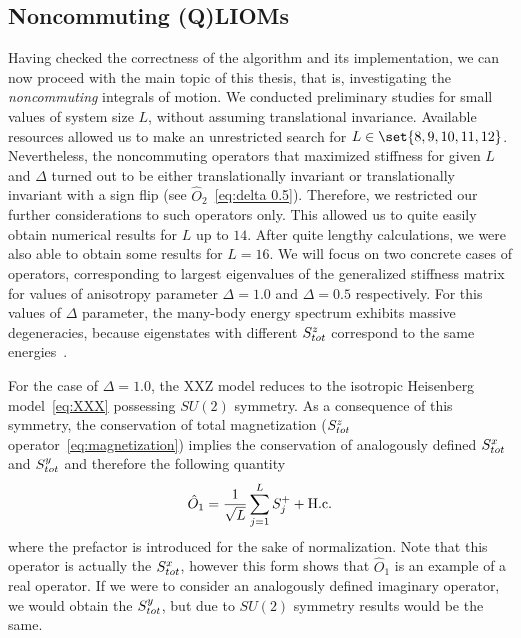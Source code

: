 \subsection{Noncommuting (Q)LIOMs\label{subsec:noncomm qlioms}}
Having checked the correctness of the algorithm and its implementation, we can now proceed with the
main topic of this thesis, that is, investigating the \textit{noncommuting} integrals of motion. 
We conducted preliminary studies for small values of system size \(L\), without assuming
translational invariance. Available resources allowed us to make an unrestricted search for
 \(L \in \set{8,9,10,11,12}\). Nevertheless, the noncommuting operators that maximized stiffness for given 
 \(L\) and \(\Delta \) turned out to be either translationally invariant or translationally invariant with
 a sign flip (see \(\hat{O}_2\)~\eqref{eq:delta 0.5}). Therefore, we restricted our further 
considerations to such operators only. This allowed us to quite easily obtain numerical
results for \(L\) up to \(14\). After quite lengthy calculations, we were also able
to obtain some results for \(L=16\).
We will focus on two concrete cases of operators, corresponding
to largest eigenvalues of the generalized stiffness matrix for values of anisotropy
parameter \(\Delta=1.0\) and \(\Delta=0.5\) respectively. For this values of
\( \Delta \) parameter, the many-body energy spectrum exhibits massive degeneracies, because
eigenstates with different \(S^{z}_{tot}\) correspond to the same energies~\autocite{Fagotti2014,Mierzejewski2021}.

For the case of \(\Delta=1.0\), the XXZ model reduces to the isotropic Heisenberg model~\eqref{eq:XXX}
possessing \(SU(2)\) symmetry.
As a consequence of this symmetry, the conservation of total magnetization 
(\(S^{z}_{tot}\) operator~\eqref{eq:magnetization}) implies the conservation of analogously defined \(S^{x}_{tot}\)
and \(S^{y}_{tot}\) and therefore the following quantity
\begin{equation}
    \hat{O}_{1} =  \frac{1}{\sqrt{L}}\sum_{j=1}^{L} S^{+}_{j} + \text{H.c.}
    \label{eq:delta 1.0}
\end{equation}
where the prefactor is introduced for the sake of normalization. Note that
this operator is actually the \(S^{x}_{tot}\), however this form shows that \(\hat{O}_1\) 
is an example of a real operator. If we were to consider an analogously defined imaginary operator,
we would obtain the \(S^{y}_{tot}\), but due to \(SU(2)\) symmetry results would be the same.


